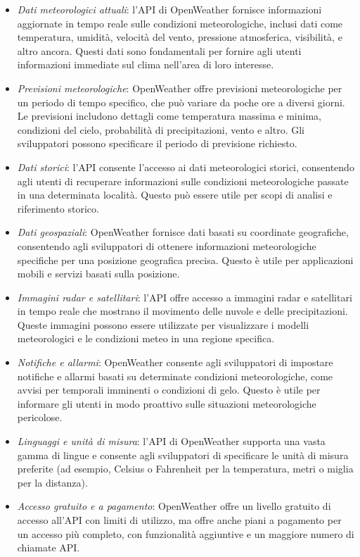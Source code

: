 \begin{itemize}
    \item \textit{Dati meteorologici attuali}: l'API di OpenWeather fornisce informazioni aggiornate in tempo reale sulle condizioni meteorologiche, inclusi dati come temperatura, umidità, velocità del vento, pressione atmosferica, visibilità, e altro ancora. Questi dati sono fondamentali per fornire agli utenti informazioni immediate sul clima nell'area di loro interesse. 
    \item \textit{Previsioni meteorologiche}: OpenWeather offre previsioni meteorologiche per un periodo di tempo specifico, che può variare da poche ore a diversi giorni. Le previsioni includono dettagli come temperatura massima e minima, condizioni del cielo, probabilità di precipitazioni, vento e altro. Gli sviluppatori possono specificare il periodo di previsione richiesto. 
    \item \textit{Dati storici}: l'API consente l'accesso ai dati meteorologici storici, consentendo agli utenti di recuperare informazioni sulle condizioni meteorologiche passate in una determinata località. Questo può essere utile per scopi di analisi e riferimento storico. 
    \item \textit{Dati geospaziali}: OpenWeather fornisce dati basati su coordinate geografiche, consentendo agli sviluppatori di ottenere informazioni meteorologiche specifiche per una posizione geografica precisa. Questo è utile per applicazioni mobili e servizi basati sulla posizione. 
    \item \textit{Immagini radar e satellitari}: l'API offre accesso a immagini radar e satellitari in tempo reale che mostrano il movimento delle nuvole e delle precipitazioni. Queste immagini possono essere utilizzate per visualizzare i modelli meteorologici e le condizioni meteo in una regione specifica. 
    \item \textit{Notifiche e allarmi}: OpenWeather consente agli sviluppatori di impostare notifiche e allarmi basati su determinate condizioni meteorologiche, come avvisi per temporali imminenti o condizioni di gelo. Questo è utile per informare gli utenti in modo proattivo sulle situazioni meteorologiche pericolose. 
    \item \textit{Linguaggi e unità di misura}: l'API di OpenWeather supporta una vasta gamma di lingue e consente agli sviluppatori di specificare le unità di misura preferite (ad esempio, Celsius o Fahrenheit per la temperatura, metri o miglia per la distanza). 
    \item \textit{Accesso gratuito e a pagamento}: OpenWeather offre un livello gratuito di accesso all'API con limiti di utilizzo, ma offre anche piani a pagamento per un accesso più completo, con funzionalità aggiuntive e un maggiore numero di chiamate API.
\end{itemize}


